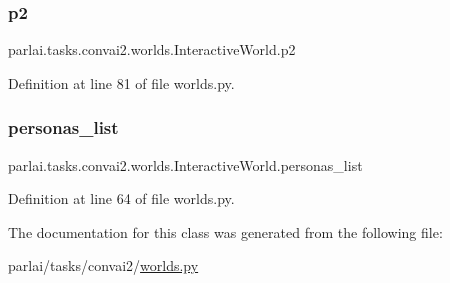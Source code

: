 \subsubsection{\texorpdfstring{p2}{p2}}
{\footnotesize\ttfamily parlai.\+tasks.\+convai2.\+worlds.\+Interactive\+World.\+p2}



Definition at line 81 of file worlds.\+py.

\mbox{\label{classparlai_1_1tasks_1_1convai2_1_1worlds_1_1InteractiveWorld_a544124310a84b4fb70abda3b41df5323}} 
\subsubsection{\texorpdfstring{personas\+\_\+list}{personas\_list}}
{\footnotesize\ttfamily parlai.\+tasks.\+convai2.\+worlds.\+Interactive\+World.\+personas\+\_\+list}



Definition at line 64 of file worlds.\+py.



The documentation for this class was generated from the following file\+:\begin{DoxyCompactItemize}
\item 
parlai/tasks/convai2/\hyperlink{parlai_2tasks_2convai2_2worlds_8py}{worlds.\+py}\end{DoxyCompactItemize}
